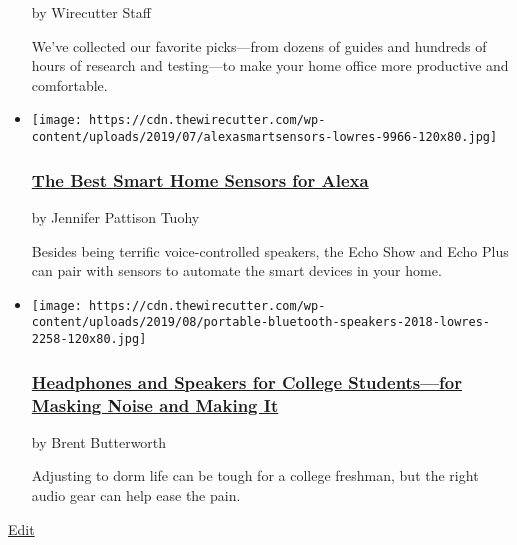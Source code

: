 \begin{itemize}
  by Wirecutter Staff

  We've collected our favorite picks---from dozens of guides and
  hundreds of hours of research and testing---to make your home office
  more productive and comfortable.
\item
  \href{https://www.nytimes.com/wirecutter/reviews/best-smart-home-sensors-for-alexa/}{}

  \texttt{[image: https://cdn.thewirecutter.com/wp-content/uploads/2019/07/alexasmartsensors-lowres-9966-120x80.jpg]}

  \hypertarget{the-best-smart-home-sensors-for-alexa}{%
  \subsubsection{\texorpdfstring{\href{https://www.nytimes.com/wirecutter/reviews/best-smart-home-sensors-for-alexa/}{The
  Best Smart Home Sensors for
  Alexa}}{The Best Smart Home Sensors for Alexa}}\label{the-best-smart-home-sensors-for-alexa}}

  by Jennifer Pattison Tuohy

  Besides being terrific voice-controlled speakers, the Echo Show and
  Echo Plus can pair with sensors to automate the smart devices in your
  home.
\item
  \href{https://www.nytimes.com/wirecutter/blog/headphones-and-speakers-for-college-students/}{}

  \texttt{[image: https://cdn.thewirecutter.com/wp-content/uploads/2019/08/portable-bluetooth-speakers-2018-lowres-2258-120x80.jpg]}

  \hypertarget{headphones-and-speakers-for-college-studentsfor-masking-noise-and-making-it}{%
  \subsubsection{\texorpdfstring{\href{https://www.nytimes.com/wirecutter/blog/headphones-and-speakers-for-college-students/}{Headphones
  and Speakers for College Students---for Masking Noise and Making
  It}}{Headphones and Speakers for College Students---for Masking Noise and Making It}}\label{headphones-and-speakers-for-college-studentsfor-masking-noise-and-making-it}}

  by Brent Butterworth

  Adjusting to dorm life can be tough for a college freshman, but the
  right audio gear can help ease the pain.
\end{itemize}

\href{https://thewirecutter.com/wp-admin/post.php?post=143950\&action=edit}{Edit}

